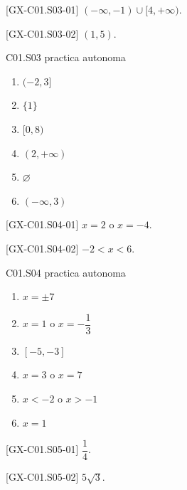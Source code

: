 \begin{shortanswer}{[GX-C01.S03-01]}
\((-\infty,-1)\cup [4,+\infty)\).
\end{shortanswer}

\begin{shortanswer}{[GX-C01.S03-02]}
\((1,5)\).
\end{shortanswer}

\begin{shortanswer}{C01.S03 practica autonoma}
\begin{enumerate}[label=\textbf{PX-C01.S03-\arabic*:}, leftmargin=*]
  \item \((-2,3]\)
  \item \(\{1\}\)
  \item \([0,8)\)
  \item \((2,+\infty)\)
  \item \(\varnothing\)
  \item \((-\infty,3)\)
\end{enumerate}
\end{shortanswer}

\begin{shortanswer}{[GX-C01.S04-01]}
\(x=2\) o \(x=-4\).
\end{shortanswer}

\begin{shortanswer}{[GX-C01.S04-02]}
\(-2<x<6\).
\end{shortanswer}

\begin{shortanswer}{C01.S04 practica autonoma}
\begin{enumerate}[label=\textbf{PX-C01.S04-\arabic*:}, leftmargin=*]
  \item \(x=\pm 7\)
  \item \(x=1\) o \(x=-\dfrac{1}{3}\)
  \item \([-5,-3]\)
  \item \(x=3\) o \(x=7\)
  \item \(x<-2\) o \(x>-1\)
  \item \(x=1\)
\end{enumerate}
\end{shortanswer}

\begin{shortanswer}{[GX-C01.S05-01]}
\(\dfrac{1}{4}\).
\end{shortanswer}

\begin{shortanswer}{[GX-C01.S05-02]}
\(5\sqrt{3}\).
\end{shortanswer}


